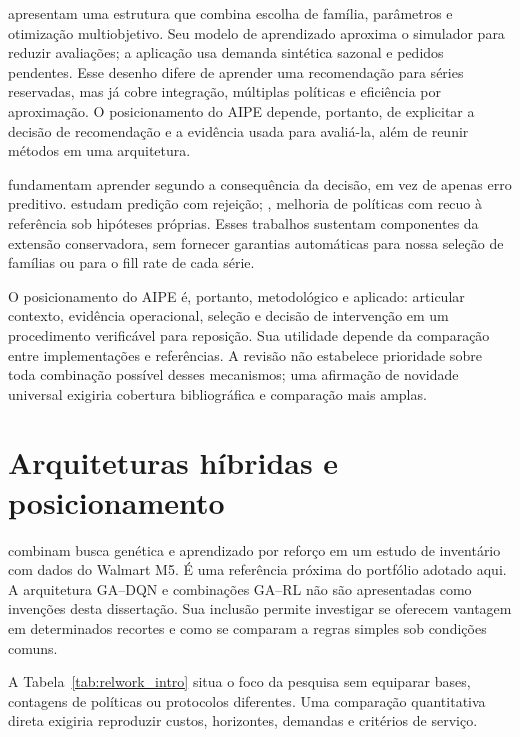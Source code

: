 \citet{FrancuzBanyai2026Selection} apresentam uma estrutura que combina escolha de família, parâmetros e otimização multiobjetivo. Seu modelo de aprendizado aproxima o simulador para reduzir avaliações; a aplicação usa demanda sintética sazonal e pedidos pendentes. Esse desenho difere de aprender uma recomendação para séries reservadas, mas já cobre integração, múltiplas políticas e eficiência por aproximação. O posicionamento do AIPE depende, portanto, de explicitar a decisão de recomendação e a evidência usada para avaliá-la, além de reunir métodos em uma arquitetura.

\citet{ElmachtoubGrigas2022SPO} fundamentam aprender segundo a consequência da decisão, em vez de apenas erro preditivo. \citet{GeifmanElYaniv2019SelectiveNet} estudam predição com rejeição; \citet{Laroche2019SPIBB}, melhoria de políticas com recuo à referência sob hipóteses próprias. Esses trabalhos sustentam componentes da extensão conservadora, sem fornecer garantias automáticas para nossa seleção de famílias ou para o fill rate de cada série.

O posicionamento do AIPE é, portanto, metodológico e aplicado: articular contexto, evidência operacional, seleção e decisão de intervenção em um procedimento verificável para reposição. Sua utilidade depende da comparação entre implementações e referências. A revisão não estabelece prioridade sobre toda combinação possível desses mecanismos; uma afirmação de novidade universal exigiria cobertura bibliográfica e comparação mais amplas.

\section{Arquiteturas híbridas e posicionamento}

\citet{Zabraoui2025GaDQN} combinam busca genética e aprendizado por reforço em um estudo de inventário com dados do Walmart M5. É uma referência próxima do portfólio adotado aqui. A arquitetura GA--DQN e combinações GA--RL não são apresentadas como invenções desta dissertação. Sua inclusão permite investigar se oferecem vantagem em determinados recortes e como se comparam a regras simples sob condições comuns.

A Tabela~\ref{tab:relwork_intro} situa o foco da pesquisa sem equiparar bases, contagens de políticas ou protocolos diferentes. Uma comparação quantitativa direta exigiria reproduzir custos, horizontes, demandas e critérios de serviço.

